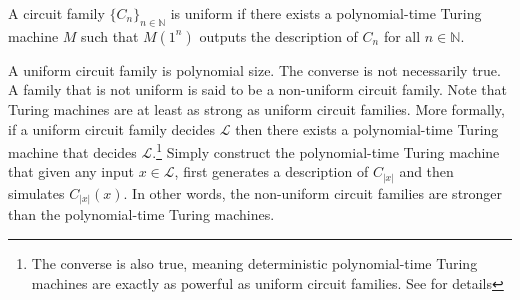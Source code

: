 \begin{definition}
A circuit family $\{C_n\}_{n \in \mathbb{N}}$ is uniform if there exists a polynomial-time Turing machine $M$ such that $M(1^n)$ outputs the description of $C_n$ for all $n\in \mathbb{N}$.
\end{definition}

A uniform circuit family is polynomial size. The converse is not necessarily true. A family that is not uniform is said to be a non-uniform circuit family. Note that Turing machines are at least as strong as uniform circuit families. More formally, if a uniform circuit family decides $\mathscr{L}$ then there exists a polynomial-time Turing machine that decides $\mathscr{L}$.\footnote{The converse is also true, meaning deterministic polynomial-time Turing machines are exactly as powerful as uniform circuit families. See \cite[pp. 111]{Arora} for details} Simply construct the polynomial-time Turing machine that given any input $x \in \mathscr{L}$, first generates a description of $C_{|x|}$ and then simulates $C_{|x|}(x)$. In other words, the non-uniform circuit families are stronger than the polynomial-time Turing machines.

